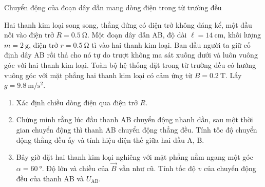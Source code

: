 \begin{dang}{Chuyển động của đoạn dây dẫn mang dòng điện trong từ trường đều}
	\end{dang}
\begin{vd}
	Hai thanh kim loại song song, thẳng đứng có điện trở không đáng kể, một đầu nối vào điện trở $R=\SI{0.5}{\ohm}$. Một đoạn dây dẫn AB, độ dài $\ell=\SI{14}{\centi\meter}$, khối lượng $m=\SI{2}{\gram}$, điện trở $r=\SI{0.5}{\ohm}$ tì vào hai thanh kim loại. Ban đầu người ta giữ cố định dây AB rồi thả cho nó tự do trượt không ma sát xuống dưới và luôn vuông góc với hai thanh kim loại. Toàn bộ hệ thống đặt trong từ trường đều có hướng vuông góc với mặt phẳng hai thanh kim loại có cảm ứng từ $B=\SI{0.2}{\tesla}$. Lấy $g=\SI{9.8}{\meter/\second^2}$.
	\begin{center}
	\end{center}
	\begin{enumerate}[label=\alph*)]
		\item Xác định chiều dòng điện qua điện trở $R$.
		\item Chứng minh rằng lúc đầu thanh AB chuyển động nhanh dần, sau một thời gian chuyển động thì thanh AB chuyển động thẳng đều. Tính tốc độ chuyển động thẳng đều ấy và tính hiệu điện thế giữa hai đầu A, B.
		\item Bây giờ đặt hai thanh kim loại nghiêng với mặt phẳng nằm ngang một góc $\alpha=\SI{60}{\degree}$. Độ lớn và chiều của $\vec{B}$ vẫn như cũ. Tính tốc độ $v$ của chuyển động đều của thanh AB và $U_\text{AB}$.
	\end{enumerate}
\end{vd}

